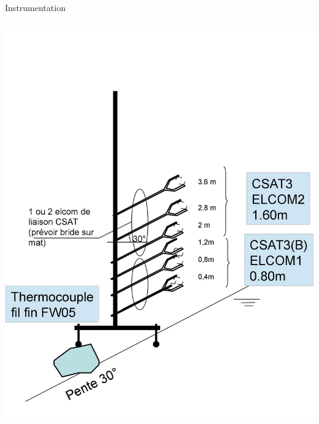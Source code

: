\documentclass{beamer}
\begin{document}

\begin{frame}{Instrumentation}

\begin{columns}
\includegraphics[width=1.1\textwidth]{0001.jpg}

\end{columns}
\end{frame}
\end{document}
